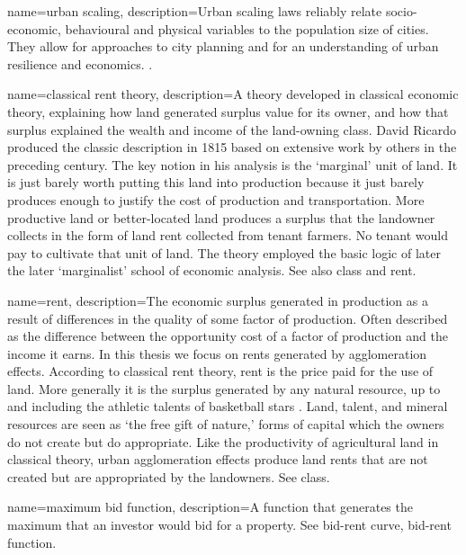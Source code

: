 {
name=urban scaling,
description={Urban scaling laws reliably relate socio-economic, behavioural and physical variables to the population size of cities. They allow for approaches  to city planning and for an understanding of urban resilience and economics. %
}.
}

{
name=classical rent theory,
description={A theory developed in \gls{classical economic theory}, explaining how land generated surplus value for its owner, and how that surplus explained the wealth and income of the land-owning class. David Ricardo produced the classic description in 1815 based on extensive work  %
by others in the preceding century. The key notion in his analysis is the `marginal' unit of land. It is just barely worth putting this land into production because it just barely produces enough to justify the cost of production and transportation. More productive land or better-located land produces a surplus that the landowner collects in the form of land rent collected from tenant farmers. No tenant would pay to cultivate that unit of land. The theory employed the basic logic of later the later `marginalist' school of economic analysis. See also \gls{class} and \gls{rent}.}
}

{
name=rent,
description={The economic  surplus generated in production as a result of differences in the quality of some \gls{factor of production}. Often described as the difference between the opportunity cost of a factor of production and the income it earns. In this thesis we focus on rents generated by \glspl{agglomeration effect}. According to \gls{classical rent theory}, rent is the price paid for the use of land. More generally it is the  surplus generated by any natural resource, up to and including the athletic talents of basketball stars \cite{lackmanClassicalBaseModern1976}. Land, talent, and mineral resources are seen as `the free gift of nature,' forms of capital which the owners do not create but do appropriate. Like the productivity of agricultural land in classical theory,  urban \glspl{agglomeration effect} produce land rents that are not created but are appropriated by the landowners. See \gls{class}.}
}

{
name=maximum bid function,
description={A function that generates the maximum that an investor would bid for a property.  See \gls{bid-rent curve}, \gls{bid-rent function}.}
}

